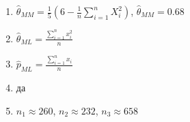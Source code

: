 \begin{enumerate}
\item $\hat{\theta}_{MM} = \frac{1}{5}\left(6 - \frac{1}{n}\sum_{i=1}^n X_i^2 \right)$, $\hat{\theta}_{MM} = 0.68$
\item $\hat{\theta}_{ML} = \frac{\sum_{i=1}^n x_i^2}{n}$
\item $\hat{p}_{ML} = \frac{\sum_{i=1}^n x_i}{n}$
\item да
\item $n_1 \approx 260$, $n_2 \approx 232$, $n_3 \approx 658$

\end{enumerate}


